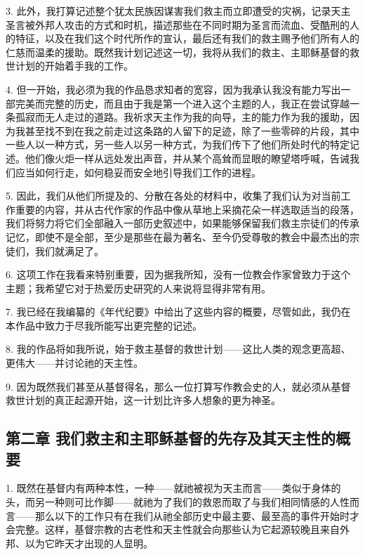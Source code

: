3. 此外，我打算记述整个犹太民族因谋害我们救主而立即遭受的灾祸，记录天主圣言被外邦人攻击的方式和时机，描述那些在不同时期为圣言而流血、受酷刑的人的特征，以及在我们这个时代所作的宣认，最后还有我们的救主赐予他们所有人的仁慈而温柔的援助。既然我计划记述这一切，我将从我们的救主、主耶稣基督的救世计划的开始着手我的工作。\par

4. 但一开始，我必须为我的作品恳求知者的宽容，因为我承认我没有能力写出一部完美而完整的历史，而且由于我是第一个进入这个主题的人，我正在尝试穿越一条孤寂而无人走过的道路。我祈求天主作为我的向导，主的能力作为我的援助，因为我甚至找不到在我之前走过这条路的人留下的足迹，除了一些零碎的片段，其中一些人以一种方式，另一些人以另一种方式，为我们传下了他们所处时代的特定记述。他们像火炬一样从远处发出声音，并从某个高耸而显眼的瞭望塔呼喊，告诫我们应当如何行走，如何稳妥而安全地引导我们工作的进程。\par

5. 因此，我们从他们所提及的、分散在各处的材料中，收集了我们认为对当前工作重要的内容，并从古代作家的作品中像从草地上采摘花朵一样选取适当的段落，我们将努力将它们全部融入一部历史叙述中，如果能够保留我们救主宗徒们的传承记忆，即使不是全部，至少是那些在最为著名、至今仍受尊敬的教会中最杰出的宗徒们，我们就满足了。\par

6. 这项工作在我看来特别重要，因为据我所知，没有一位教会作家曾致力于这个主题；我希望它对于热爱历史研究的人来说将显得非常有用。\par

7. 我已经在我编纂的《年代纪要》中给出了这些内容的概要，尽管如此，我仍在本作品中致力于尽我所能写出更完整的记述。\par

8. 我的作品将如我所说，始于救主基督的救世计划——这比人类的观念更高超、更伟大——并讨论祂的天主性。\par

9. 因为既然我们甚至从基督得名，那么一位打算写作教会史的人，就必须从基督救世计划的真正起源开始，这一计划比许多人想象的更为神圣。\par


\subsection{第二章  我们救主和主耶稣基督的先存及其天主性的概要}

1. 既然在基督内有两种本性，一种——就祂被视为天主而言——类似于身体的头，而另一种则可比作脚——就祂为了我们的救恩而取了与我们相同情感的人性而言——那么以下的工作只有在我们从祂全部历史中最主要、最至高的事件开始时才会完整。这样，基督宗教的古老性和天主性就会向那些认为它起源较晚且来自外邦、以为它昨天才出现的人显明。\par

